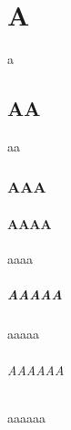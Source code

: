 \documentclass{report}
\begin{document}
\chapter{A}
a
\section{AA}
aa
\subsection{AAA}
\subsubsection*{AAAA}
aaaa
\paragraph{AAAAA}
aaaaa
\subparagraph{AAAAAA}
aaaaaa
\end{document}
